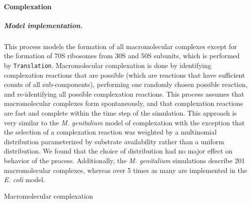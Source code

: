 \documentclass[12pt]{article}
\begin{document}
\baselineskip24pt

\paragraph{Complexation}
\label{sec:complexation}


\subparagraph{Model implementation.}
This process models the formation of all macromolecular complexes except for the formation of 70S ribosomes from 30S and 50S subunits, which is performed by \texttt{Translation}. Macromolecular complexation is done by identifying complexation reactions that are possible (which are reactions that have sufficient counts of all sub-components), performing one randomly chosen possible reaction, and re-identifying all possible complexation reactions. This process assumes that macromolecular complexes form spontaneously, and that complexation reactions are fast and complete within the time step of the simulation. This approach is very similar to the \textit{M. genitalium} model of complexation with the exception that the selection of a complexation reaction was weighted by a multinomial distribution parameterized by substrate availability rather than a uniform distribution.  We found that the choice of distribution had no major effect on behavior of the process. Additionally, the \textit{M. genitalium} simulations describe 201 macromolecular complexes, whereas over 5 times as many are implemented in the \textit{E. coli} model.\\

\begin{algorithm}[H]
\caption{Macromolecular complexation}
\label{complexation_algorithm}



\end{algorithm}
\end{document}
